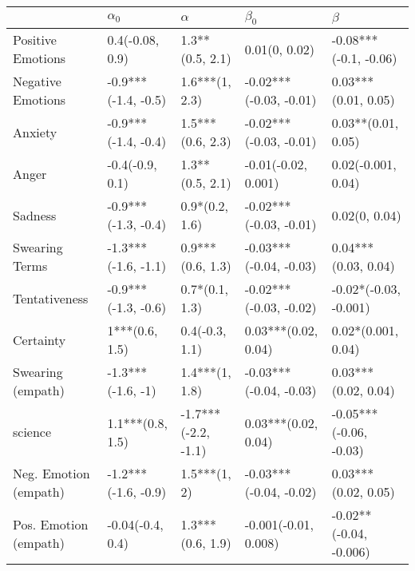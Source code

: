 \begin{tabular}{lllll}
\toprule
{} &           $\alpha_0$ &             $\alpha$ &               $\beta_0$ &                 $\beta$ \\
\midrule
Positive Emotions     &      0.4(-0.08, 0.9) &      1.3**(0.5, 2.1) &           0.01(0, 0.02) &   -0.08***(-0.1, -0.06) \\
Negative Emotions     &  -0.9***(-1.4, -0.5) &       1.6***(1, 2.3) &  -0.02***(-0.03, -0.01) &     0.03***(0.01, 0.05) \\
Anxiety               &  -0.9***(-1.4, -0.4) &     1.5***(0.6, 2.3) &  -0.02***(-0.03, -0.01) &      0.03**(0.01, 0.05) \\
Anger                 &      -0.4(-0.9, 0.1) &      1.3**(0.5, 2.1) &     -0.01(-0.02, 0.001) &      0.02(-0.001, 0.04) \\
Sadness               &  -0.9***(-1.3, -0.4) &       0.9*(0.2, 1.6) &  -0.02***(-0.03, -0.01) &           0.02(0, 0.04) \\
Swearing Terms        &  -1.3***(-1.6, -1.1) &     0.9***(0.6, 1.3) &  -0.03***(-0.04, -0.03) &     0.04***(0.03, 0.04) \\
Tentativeness         &  -0.9***(-1.3, -0.6) &       0.7*(0.1, 1.3) &  -0.02***(-0.03, -0.02) &   -0.02*(-0.03, -0.001) \\
Certainty             &       1***(0.6, 1.5) &       0.4(-0.3, 1.1) &     0.03***(0.02, 0.04) &      0.02*(0.001, 0.04) \\
Swearing (empath)     &    -1.3***(-1.6, -1) &       1.4***(1, 1.8) &  -0.03***(-0.04, -0.03) &     0.03***(0.02, 0.04) \\
science               &     1.1***(0.8, 1.5) &  -1.7***(-2.2, -1.1) &     0.03***(0.02, 0.04) &  -0.05***(-0.06, -0.03) \\
Neg. Emotion (empath) &  -1.2***(-1.6, -0.9) &         1.5***(1, 2) &  -0.03***(-0.04, -0.02) &     0.03***(0.02, 0.05) \\
Pos. Emotion (empath) &     -0.04(-0.4, 0.4) &     1.3***(0.6, 1.9) &    -0.001(-0.01, 0.008) &  -0.02**(-0.04, -0.006) \\
\bottomrule
\end{tabular}
